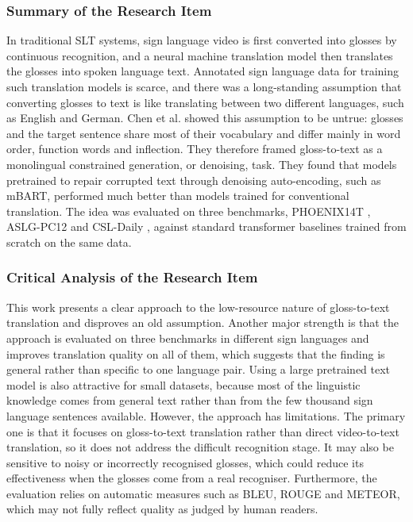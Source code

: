 \documentclass{FastFyp}
\begin{document}
\subsubsection*{Summary of the Research Item}
In traditional SLT systems, sign language video is first converted into glosses by continuous recognition, and a neural machine translation model then translates the glosses into spoken language text. Annotated sign language data for training such translation models is scarce, and there was a long-standing assumption that converting glosses to text is like translating between two different languages, such as English and German. Chen et al. \cite{ref:Chen:2026} showed this assumption to be untrue: glosses and the target sentence share most of their vocabulary and differ mainly in word order, function words and inflection. They therefore framed gloss-to-text as a monolingual constrained generation, or denoising, task. They found that models pretrained to repair corrupted text through denoising auto-encoding, such as mBART, performed much better than models trained for conventional translation. The idea was evaluated on three benchmarks, PHOENIX14T \cite{ref:Camgoz:2018}, ASLG-PC12 \cite{othman2012aslgpc12} and CSL-Daily \cite{zhou2021csldaily}, against standard transformer baselines trained from scratch on the same data.

\subsubsection*{Critical Analysis of the Research Item}
This work presents a clear approach to the low-resource nature of gloss-to-text translation and disproves an old assumption. Another major strength is that the approach is evaluated on three benchmarks in different sign languages and improves translation quality on all of them, which suggests that the finding is general rather than specific to one language pair. Using a large pretrained text model is also attractive for small datasets, because most of the linguistic knowledge comes from general text rather than from the few thousand sign language sentences available. However, the approach has limitations. The primary one is that it focuses on gloss-to-text translation rather than direct video-to-text translation, so it does not address the difficult recognition stage. It may also be sensitive to noisy or incorrectly recognised glosses, which could reduce its effectiveness when the glosses come from a real recogniser. Furthermore, the evaluation relies on automatic measures such as BLEU, ROUGE and METEOR, which may not fully reflect quality as judged by human readers.
\end{document}
